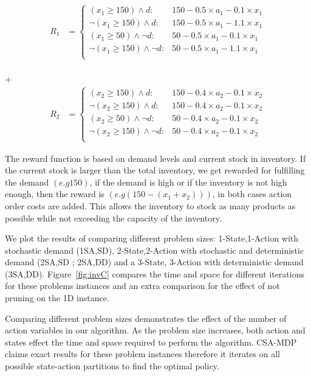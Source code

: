 {\footnotesize
\begin{align*}
R_1 & = \begin{cases}
(x_1 \geq 150) \wedge d :& 150 - 0.5\times a_1 - 0.1\times x_1 \\
\neg(x_1 \geq 150) \wedge d :& 150 - 0.5\times a_1 - 1.1\times x_1 \\
(x_1 \geq 50) \wedge \neg d :& 50 - 0.5\times a_1 - 0.1\times x_1 \\
\neg (x_1 \geq 150) \wedge \neg d :& 50 - 0.5\times a_1 - 1.1\times x_1 \\
\end{cases}
\end{align*}}
\\
+
\\
{\footnotesize
\begin{align*}
R_2 &= \begin{cases}
(x_2 \geq 150) \wedge d :& 150 - 0.4\times a_2 - 0.1\times x_2 \\
\neg(x_2 \geq 150) \wedge d :& 150 - 0.4\times a_2 - 0.1\times x_2 \\
(x_2 \geq 50) \wedge \neg d :& 50 - 0.4\times a_2 - 0.1\times x_2 \\
\neg (x_2 \geq 150) \wedge \neg d :& 50 - 0.4\times a_2 - 0.1\times x_2 \\
\end{cases}
\end{align*}}
 
The reward function is based on demand levels and current stock in inventory. If the current stock is larger than the total inventory, we get rewarded for
fulfilling the demand $(e.g 150)$, if the demand is high or if the inventory
is not high enough, then the reward is $(e.g (150 - (x_1+x_2)))$, in both
cases action order costs are added. This allows the
inventory to stock as many products as possible while not exceeding the
capacity of the inventory.
 
We plot the results of comparing different \InventoryControl problem sizes: 1-State,1-Action with stochastic demand (1SA,SD), 2-State,2-Action with stochastic and deterministic demand (2SA,SD ; 2SA,DD) and a 3-State, 3-Action with deterministic demand (3SA,DD). Figure~\ref{fig:invC} compares the time and space
for different iterations for these problems instances and an extra
comparison for the effect of not pruning on the 1D instance. 

Comparing different problem sizes demonstrates the effect of the number of action variables in our algorithm. As the problem size increases, both action and states effect the time and space required to perform the algorithm. CSA-MDP claims exact results for these problem instances therefore it iterates on all possible state-action partitions to find the optimal policy. 

